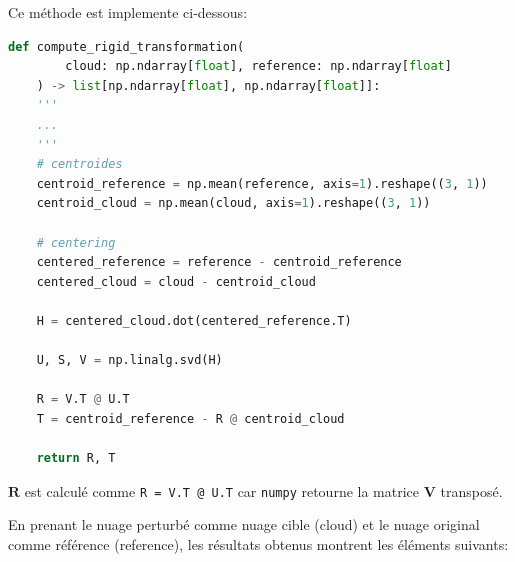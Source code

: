 \documentclass[../5RO17_TP4.tex]{subfiles}
\begin{document}
\noindent Ce méthode est implemente ci-dessous:\\

\begin{scriptsize}\mycode
	\begin{lstlisting}[language=Python, caption=\texttt{compute\_rigid\_transformation()}]
def compute_rigid_transformation(
        cloud: np.ndarray[float], reference: np.ndarray[float]
    ) -> list[np.ndarray[float], np.ndarray[float]]:
    '''
    ...
    '''
    # centroides
    centroid_reference = np.mean(reference, axis=1).reshape((3, 1))
    centroid_cloud = np.mean(cloud, axis=1).reshape((3, 1))

    # centering
    centered_reference = reference - centroid_reference
    centered_cloud = cloud - centroid_cloud

    H = centered_cloud.dot(centered_reference.T)

    U, S, V = np.linalg.svd(H)

    R = V.T @ U.T
    T = centroid_reference - R @ centroid_cloud

    return R, T
	\end{lstlisting}
\end{scriptsize}
\begin{remark}
    $\mathbf{R}$ est calculé comme \texttt{R = V.T @ U.T} car \texttt{numpy} retourne la matrice $\mathbf{V}$ transposé.
\end{remark}
En prenant le nuage perturbé comme nuage cible (cloud) et le nuage original comme référence (reference), les résultats obtenus montrent les éléments suivants:
\end{document}

